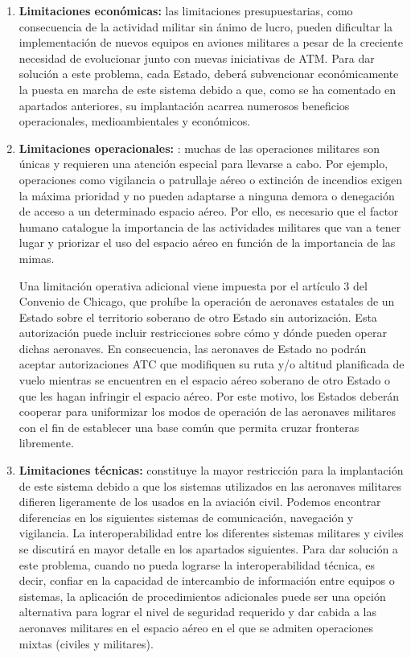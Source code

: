 \begin{enumerate}
    \item \textbf{Limitaciones económicas:} las limitaciones presupuestarias, como consecuencia de la actividad militar sin ánimo de lucro, pueden dificultar la implementación de nuevos equipos en aviones militares a pesar de la creciente necesidad de evolucionar junto con nuevas iniciativas de ATM. Para dar solución a este problema, cada Estado, deberá subvencionar económicamente la puesta en marcha de este sistema debido a que, como se ha comentado en apartados anteriores, su implantación acarrea numerosos beneficios operacionales, medioambientales y económicos. 
    
    \item \textbf{Limitaciones operacionales:} : muchas de las operaciones militares son únicas y requieren una atención especial para llevarse a cabo. Por ejemplo, operaciones como vigilancia o patrullaje aéreo o extinción de incendios exigen la máxima prioridad y no pueden adaptarse a ninguna demora o denegación de acceso a un determinado espacio aéreo. Por ello, es necesario que el factor humano catalogue la importancia de las actividades militares que van a tener lugar y priorizar el uso del espacio aéreo en función de la importancia de las mimas.
    
    Una limitación operativa adicional viene impuesta por el artículo 3 del Convenio de Chicago, que prohíbe la operación de aeronaves estatales de un Estado sobre el territorio soberano de otro Estado sin autorización. Esta autorización puede incluir restricciones sobre cómo y dónde pueden operar dichas aeronaves. En consecuencia, las aeronaves de Estado no podrán aceptar autorizaciones ATC que modifiquen su ruta y/o altitud planificada de vuelo mientras se encuentren en el espacio aéreo soberano de otro Estado o que les hagan infringir el espacio aéreo. Por este motivo, los Estados deberán cooperar para uniformizar los modos de operación de las aeronaves militares con el fin de establecer una base común que permita cruzar fronteras libremente. 

    \item \textbf{Limitaciones técnicas:} constituye la mayor restricción para la implantación de este sistema debido a que los sistemas utilizados en las aeronaves militares difieren ligeramente de los usados en la aviación civil. Podemos encontrar diferencias en los siguientes sistemas de comunicación, navegación y vigilancia. La interoperabilidad entre los diferentes sistemas militares y civiles se discutirá en mayor detalle en los apartados siguientes. Para dar solución a este problema, cuando no pueda lograrse la interoperabilidad técnica, es decir, confiar en la capacidad de intercambio de información entre equipos o sistemas, la aplicación de procedimientos adicionales puede ser una opción alternativa para lograr el nivel de seguridad requerido y dar cabida a las aeronaves militares en el espacio aéreo en el que se admiten operaciones mixtas (civiles y militares).
    

\end{enumerate}
